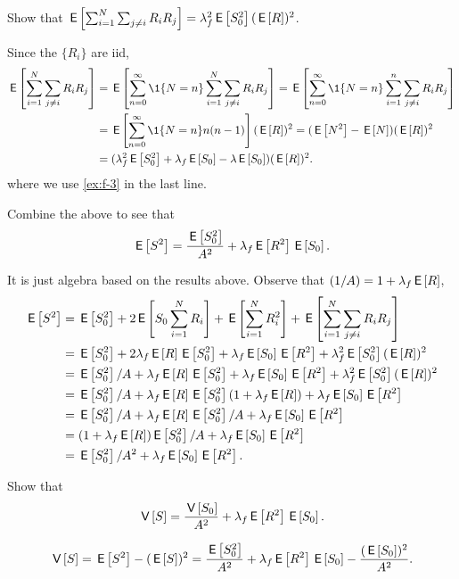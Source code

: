 \begin{exercise}\label{ex:f-88}
Show that
$\E{\sum_{i=1}^N \sum_{j\neq i} R_i R_j} = \lambda_f^2 \E{S_0^2} (\E{R})^2$.
\begin{solution}
Since the $\{R_i\}$ are iid,
 \begin{align*}
\E{\sum_{i=1}^N \sum_{j\neq i} R_i R_j}
&=\E{\sum_{n=0}^\infty \1{N=n} \sum_{i=1}^N \sum_{j\neq i} R_i R_j}
=\E{\sum_{n=0}^\infty \1{N=n} \sum_{i=1}^n \sum_{j\neq i} R_i R_j} \\
&=\E{\sum_{n=0}^\infty \1{N=n} n(n-1)} (\E{R})^2
=(\E{N^2} - \E{N}) (\E{R})^2\\
&=(\lambda_f^2 \E{S_0^2} + \lambda_f \E{S_0} - \lambda \E{S_0} ) (\E{R})^2.
 \end{align*}
where we use \cref{ex:f-3} in the last line.
\end{solution}
\end{exercise}

\begin{exercise}\label{ex:802}
 Combine the above to see that
 \begin{equation*}
 \E{S^2} = \frac{\E{S_0^2}}{A^2} + \lambda_f \E{R^2} \E{S_0}.
 \end{equation*}
\begin{solution}
It is just algebra based on the results above.  Observe that $(1/A) = 1+\lambda_f \E R$,
\begin{align*}
  \E{S^2}
  &= \E{S_0^2} + 2\E{S_0 \sum_{i=1}^N R_i} + \E{\sum_{i=1}^N R_i^2} + \E{\sum_{i=1}^N \sum_{j\neq i} R_i R_j} \\
  &= \E{S_0^2} + 2 \lambda_f \E R \E{S_0^2} + \lambda_f \E{S_0 }\E{R^2} +  \lambda_f^2 \E{S_0^2} (\E{R})^2 \\
  &= \E{S_0^2}/A  +  \lambda_f \E R \E{S_0^2} + \lambda_f \E{S_0 }\E{R^2} +  \lambda_f^2 \E{S_0^2} (\E{R})^2 \\
  &= \E{S_0^2}/A  +  \lambda_f \E R \E{S_0^2}(1+\lambda_f \E R)  + \lambda_f \E{S_0 }\E{R^2}\\
  &= \E{S_0^2}/A  +  \lambda_f \E R \E{S_0^2}/A + \lambda_f \E{S_0 }\E{R^2}\\
  &= (1  +  \lambda_f \E R) \E{S_0^2}/A  + \lambda_f \E{S_0 }\E{R^2}\\
  &= \E{S_0^2}/A^2  + \lambda_f \E{S_0 }\E{R^2}.
\end{align*}
\end{solution}
\end{exercise}

\begin{exercise}\label{ex:83}
Show that
 \begin{equation*}
 \V{S} = \frac{\V{S_0}}{A^2} + \lambda_f \E{R^2} \E{S_0}.
 \end{equation*}
\begin{solution}
 \begin{equation*}
 \V{S} = \E{S^2} - (\E S)^2 =
\frac{\E{S_0^2}}{A^2} + \lambda_f \E{R^2} \E{S_0} -\frac{(\E{S_0})^2}{A^2}.
 \end{equation*}
\end{solution}
\end{exercise}

